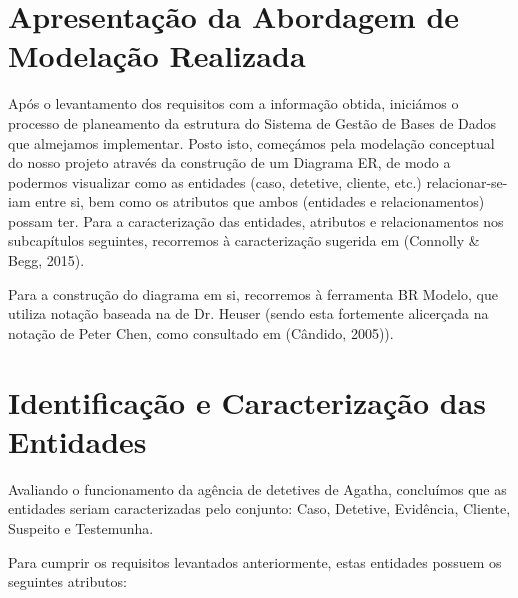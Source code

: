 \documentclass[a4paper,12pt]{scrreprt}
\begin{document}
    \section{Apresentação da Abordagem de Modelação Realizada}
        {
            Após o levantamento dos requisitos com a informação obtida, iniciámos o processo de planeamento da estrutura do Sistema de Gestão de Bases de Dados que almejamos implementar.
            Posto isto, começámos pela modelação conceptual do nosso projeto através da construção de um Diagrama ER, de modo a podermos visualizar como as entidades (caso, detetive, cliente, etc.) relacionar-se-iam entre si, bem como os atributos que ambos (entidades e relacionamentos) possam ter. Para a caracterização das entidades, atributos e relacionamentos nos subcapítulos seguintes, recorremos à caracterização sugerida em  \cite{DatabaseSystems} (Connolly \& Begg, 2015).

            Para a construção do diagrama em si, recorremos à ferramenta BR Modelo, que utiliza notação baseada na de Dr$.$ Heuser (sendo esta fortemente alicerçada na notação de Peter Chen, como consultado em \cite{Aprendizagem em Banco de Dados} (Cândido, 2005)).
        }

    \clearpage
        
    \section{Identificação e Caracterização das Entidades}
        Avaliando o funcionamento da agência de detetives de Agatha, concluímos que as entidades seriam caracterizadas pelo conjunto: Caso, Detetive, Evidência, Cliente, Suspeito e Testemunha.

        Para cumprir os requisitos levantados anteriormente, estas entidades possuem os seguintes atributos:
\end{document}

